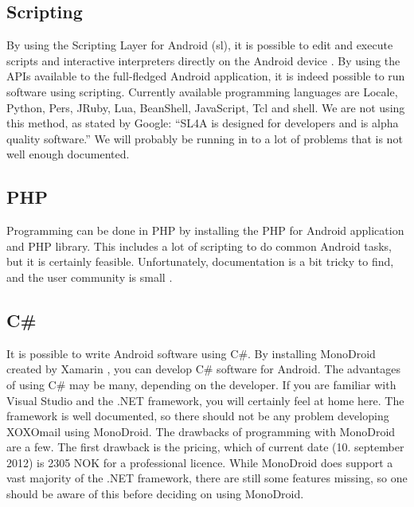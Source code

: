 \subsection{Scripting}
By using the Scripting Layer for Android (\gls{sl}), it is possible to edit and execute scripts and interactive interpreters directly on the Android device \cite{bib:slfa}. By using the APIs available to the full-fledged Android application, it is indeed possible to run software using scripting. Currently available programming languages are Locale, Python, Pers, JRuby, Lua, BeanShell, JavaScript, Tcl and shell. We are not using this method, as stated by Google: “SL4A is designed for developers and is alpha quality software.” We will probably be running in to a lot of problems that is not well enough documented.

\subsection{PHP}
Programming can be done in PHP by installing the PHP for Android application and PHP library. This includes a lot of scripting to do common Android tasks, but it is certainly feasible. Unfortunately, documentation is a bit tricky to find, and the user community is small \cite{bib:php}.

\subsection{C\#}
It is possible to write Android software using C\#. By installing MonoDroid created by Xamarin \cite{bib:mbx}, you can develop C\# software for Android. The advantages of using C\# may be many, depending on the developer. If you are familiar with Visual Studio and the .NET framework, you will certainly feel at home here. The framework is well documented, so there should not be any problem developing XOXOmail using MonoDroid.
\newline
\newline
The drawbacks of programming with MonoDroid are a few. The first drawback is the pricing, which of current date (10. september 2012) is 2305 NOK for a professional licence. While MonoDroid does support a vast majority of the .NET framework, there are still some features missing, so one should be aware of this before deciding on using MonoDroid.

